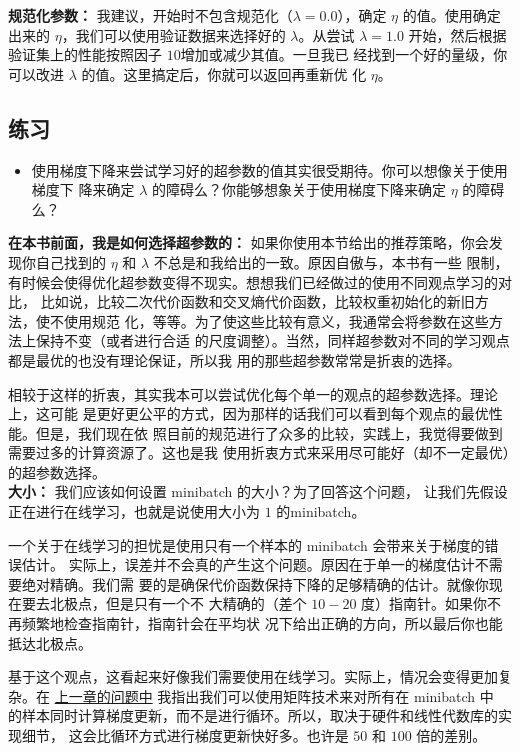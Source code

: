 \textbf{规范化参数：} 我建议，开始时不包含规范化（$\lambda=0.0$），确定 $\eta$
的值。使用确定出来的 $\eta$，我们可以使用验证数据来选择好的 $\lambda$。从尝试
$\lambda=1.0$ 开始，然后根据验证集上的性能按照因子 $10$增加或减少其值。一旦我已
经找到一个好的量级，你可以改进 $\lambda$ 的值。这里搞定后，你就可以返回再重新优
化 $\eta$。

\subsection*{练习}

\begin{itemize}
\item 使用梯度下降来尝试学习好的超参数的值其实很受期待。你可以想像关于使用梯度下
  降来确定 $\lambda$ 的障碍么？你能够想象关于使用梯度下降来确定 $\eta$ 的障碍么？
\end{itemize}

\textbf{在本书前面，我是如何选择超参数的：} 如果你使用本节给出的推荐策略，你会发
现你自己找到的 $\eta$ 和 $\lambda$ 不总是和我给出的一致。原因自傲与，本书有一些
限制，有时候会使得优化超参数变得不现实。想想我们已经做过的使用不同观点学习的对比，
比如说，比较二次代价函数和交叉熵代价函数，比较权重初始化的新旧方法，使不使用规范
化，等等。为了使这些比较有意义，我通常会将参数在这些方法上保持不变（或者进行合适
  的尺度调整）。当然，同样超参数对不同的学习观点都是最优的也没有理论保证，所以我
用的那些超参数常常是折衷的选择。

相较于这样的折衷，其实我本可以尝试优化每个单一的观点的超参数选择。理论上，这可能
是更好更公平的方式，因为那样的话我们可以看到每个观点的最优性能。但是，我们现在依
照目前的规范进行了众多的比较，实践上，我觉得要做到需要过多的计算资源了。这也是我
使用折衷方式来采用尽可能好（却不一定最优）的超参数选择。\\

\label{mini_batch_size}
\textbf{\minibatch{}大小：} 我们应该如何设置 minibatch 的大小？为了回答这个问题，
让我们先假设正在进行在线学习，也就是说使用大小为 $1$ 的minibatch。

一个关于在线学习的担忧是使用只有一个样本的 minibatch 会带来关于梯度的错误估计。
实际上，误差并不会真的产生这个问题。原因在于单一的梯度估计不需要绝对精确。我们需
要的是确保代价函数保持下降的足够精确的估计。就像你现在要去北极点，但是只有一个不
大精确的（差个 $10-20$ 度）指南针。如果你不再频繁地检查指南针，指南针会在平均状
况下给出正确的方向，所以最后你也能抵达北极点。

基于这个观点，这看起来好像我们需要使用在线学习。实际上，情况会变得更加复杂。在
\hyperref[ch:]{上一章的问题中} 我指出我们可以使用矩阵技术来对所有在 minibatch 中
的样本同时计算梯度更新，而不是进行循环。所以，取决于硬件和线性代数库的实现细节，
这会比循环方式进行梯度更新快好多。也许是 $50$ 和 $100$ 倍的差别。

